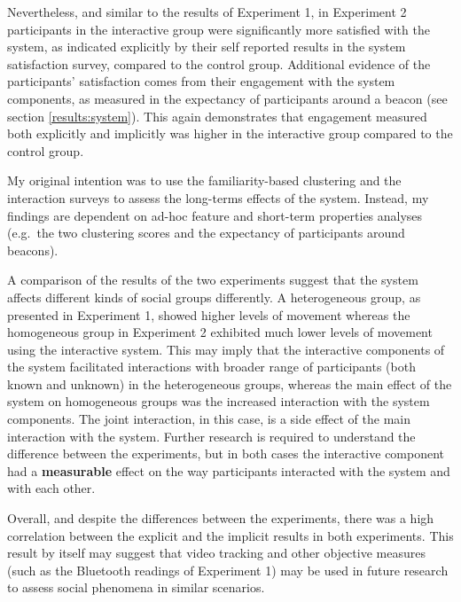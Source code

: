 \documentclass[a4paper,11pt]{article}
\begin{document}
{Nevertheless, and similar to the results of Experiment 1, in Experiment 2 participants in the interactive group were significantly more satisfied with the system, as indicated explicitly by their self reported results in the system satisfaction survey, compared to the control group.
Additional evidence of the participants' satisfaction comes from their engagement with the system components, as measured in the expectancy of participants around a beacon (see section \ref{results:system}).
This again demonstrates that engagement measured both explicitly and implicitly was higher in the interactive group compared to the control group.

My original intention was to use the familiarity-based clustering and the interaction surveys to assess the long-terms effects of the system.
Instead, my findings are dependent on ad-hoc feature and short-term properties analyses (e.g.\ the two clustering scores and the expectancy of participants around beacons).

A comparison of the results of the two experiments suggest that the system affects different kinds of social groups differently.
A heterogeneous group, as presented in Experiment 1, showed higher levels of movement whereas the homogeneous group in Experiment 2 exhibited much lower levels of movement using the interactive system.
This may imply that the interactive components of the system facilitated interactions with broader range of participants (both known and unknown) in the heterogeneous groups, whereas the main effect of the system on homogeneous groups was the increased interaction with the system components.
The joint interaction, in this case, is a side effect of the main interaction with the system.
Further research is required to understand the difference between the experiments, but in both cases the interactive component had a \textbf{measurable} effect on the way participants interacted with the system and with each other.

Overall, and despite the differences between the experiments, there was a high correlation between the explicit and the implicit results in both experiments.
This result by itself may suggest that video tracking and other objective measures (such as the Bluetooth readings of Experiment 1) may be used in future research to assess social phenomena in similar scenarios.

}
\end{document}

